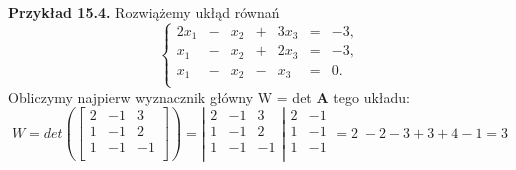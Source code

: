 \documentclass[a4paper,12pt]{article}
\begin{document}
  
	\textbf{Przykład 15.4.} Rozwiążemy ukłąd równań
	$$
	\left \{
	\begin{array}{rcrrrcl}
		2x_1& -& x_2& +& 3x_3 & = & -3,\\
		x_1 &- &x_2 &+ &2x_3 & = & -3,\\
		x_1 &- &x_2 &- &x_3 & = & 0.\\
	\end{array}
	\right .	
	$$
	Obliczymy najpierw wyznacznik główny W = det \textbf{A} tego układu:
	$$
	W = det
	\left(
	\left[
		\begin{array}{rrr}
	2 & -1 & 3\\
	1 & -1 & 2\\
	1 & -1 & -1\\
	\end{array}
	\right]
	\right)
	= 
	\left|
	\begin{array}{rrr}
	2 & -1 & 3\\
	1 & -1 & 2\\
	1 & -1 & -1\\
	\end{array}
	\right|
	\begin{array}{cc}
	2 & -1 \\
	1 & -1 \\
	1 & -1 \\
	\end{array}
	= 2\;- 2 - 3 + 3 + 4 - 1 = 3
	$$
\end{document}
